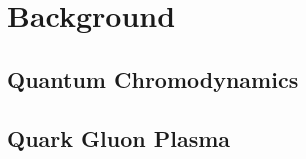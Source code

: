 \chapter{Background}
\label{ch:intro_background}

\section{Quantum Chromodynamics}

\label{sec:qcd}

\section{Quark Gluon Plasma}

\label{sec:qgp}

%

%
